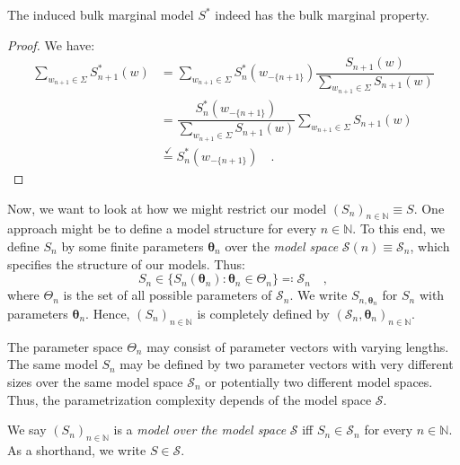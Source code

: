 \documentclass[../../main.tex]{subfiles}
\begin{document}
    \begin{lemma}
        The induced bulk marginal model $S^*$ indeed has the bulk marginal property.
    \end{lemma}
    \vspace{-2.5em}
    \begin{proof}
        We have:
        \begin{align*}
            \sum_{w_{n + 1} \in \Sigma} S_{n + 1}^*(w) &= \sum_{w_{n + 1} \in \Sigma} S_n^*(w_{-\{n+1\}}) \dfrac{S_{n+1}(w)}{\sum_{w_{n+1} \in \Sigma} S_{n+1}(w)} \\
            &= \dfrac{S_n^*(w_{-\{n+1\}})}{\sum_{w_{n+1} \in \Sigma} S_{n+1}(w)} \sum_{w_{n + 1} \in \Sigma} S_{n+1}(w) \\
            &\overset{\checkmark}{=} S_n^*(w_{-\{n+1\}}) \quad .
        \end{align*}
    \end{proof}

\pagebreak
    Now, we want to look at how we might restrict our model $(S_n)_{n \in \mathbb{N}} \equiv S$. One approach might be to define a model structure for every $n \in \mathbb{N}$. To this end, we define $S_n$ by some finite parameters $\bm{\theta}_n$ over the \emph{model space} $\mathcal{S}(n) \equiv \mathcal{S}_n$, which specifies the structure of our models. Thus:
    \[
        S_n \in \{ S_n(\bm{\theta}_n) : \bm{\theta}_n \in \Theta_n \} \eqqcolon \mathcal{S}_n \quad ,
    \]
    where $\Theta_n$ is the set of all possible parameters of $\mathcal{S}_n$. We write $S_{n, \bm{\theta}_n}$ for $S_n$ with parameters $\bm{\theta}_n$. Hence, $(S_n)_{n \in \mathbb{N}}$ is completely defined by $(\mathcal{S}_n, \bm{\theta}_n)_{n \in \mathbb{N}}$.

    \begin{remark}
        The parameter space $\Theta_n$ may consist of parameter vectors with varying lengths. The same model $S_n$ may be defined by two parameter vectors with very different sizes over the same model space $\mathcal{S}_n$ or potentially two different model spaces. Thus, the parametrization complexity depends of the model space $\mathcal{S}$.
    \end{remark}

    \begin{definition}
        We say $(S_n)_{n \in \mathbb{N}}$ is a \emph{model over the model space} $\mathcal{S}$ iff $S_n \in \mathcal{S}_n$ for every $n \in \mathbb{N}$. As a shorthand, we write $S \in \mathcal{S}$.
    \end{definition}
\end{document}
